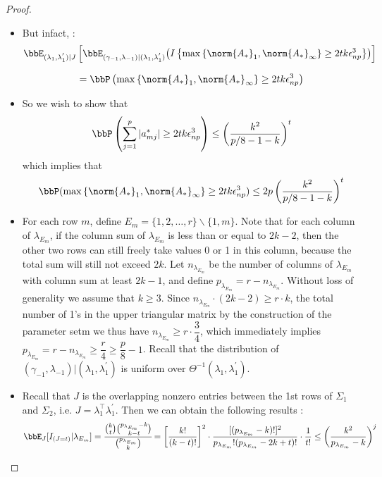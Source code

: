 \begin{proof}
\begin{itemize}
\begin{itemize}
    
\newpage
    \vspace{5mm}    
    \item But infact, :
    $$
    \bbE_{{(\lambda_{1},\lambda_1^{'})}\vert J}\left[\bbE_{(\gamma_{-1},\lambda_{-1}) \vert (\lambda_1,\lambda_1^{'})} {\left( I \left\{ \max\left\{\norm{A_*}_1,\norm{A_*}_{\infty}\right\} \geq 2tk\epsilon^3_{np} \right\}  \right)}\right]
    $$
    
    $$
    = \bbP\left( \max\left\{\norm{A_*}_1,\norm{A_*}_{\infty}\right\} \geq 2tk\epsilon^3_{np} \right)
    $$

    \vspace{5mm}    
    \item So we wish to show that
    $$
    \bbP\left(\displaystyle\sum_{j=1}^{p}{|a^*_{mj}|} \geq 2tk\epsilon^3_{np} \right) \leq \left(\dfrac{k^2}{p/8 -1 -k}  \right)^t
    $$
    which implies that
    $$
    \bbP( \max\left\{\norm{A_*}_1,\norm{A_*}_{\infty}\right\} \geq 2tk\epsilon^3_{np}) \leq 2p\left(\dfrac{k^2}{p/8 -1 -k}  \right)^t
    $$
    \vspace{5mm}    
    \item For each row $m$, define $E_m = \{1,2,\ldots,r\} \backslash \{1,m\}.$ Note that for each column of $\lambda_{E_m}$, if the column sum of $\lambda_{E_m}$ is less than or equal to $2k-2$, then the other two rows can still freely take values 0 or 1 in this column, because the total sum will still not exceed $2k$. Let $n_{\lambda_{E_m}}$ be the number of columns of $\lambda_{E_m}$ with column sum at least $2k-1$, and define $p_\lambda_{E_m} = r - n_{\lambda_{E_m}}$. Without loss of generality we assume that $k\geq 3$. Since $n_{\lambda_{E_m}}\cdot(2k-2)\geq r\cdot k$, the total number of 1's in the upper triangular matrix by the construction of the parameter setm we thus have $n_{\lambda_{E_m}} \geq r \cdot \dfrac{3}{4}$, which immediately implies $p_{\lambda_{E_m}} = r -  n_{\lambda_{E_m}} \geq \dfrac{r}{4} \geq \dfrac{p}{8} - 1$. Recall that the distribution of $(\gamma_{-1},\lambda_{-1})|(\lambda_1,{\lambda^{'}_{1}})$ is uniform over $\Theta^{-1}(\lambda_1,{\lambda^{'}_{1}})$.

    \vspace{5mm}    
    \item Recall that $J$ is the overlapping nonzero entries between the 1st rows of $\Sigma_1$ and $\Sigma_2$, i.e. $J=\lambda^{\top}_{1} \lambda^{'}_{1}$. Then we can obtain the following results : 
    $$
    \bbE_J [ I_{(J=t)} | \lambda_{E_m} ] = \cfrac{{k \choose t}{{p_{\lambda_{E_m}} -k} \choose {k-t}}}{{{p_{\lambda_{E_m}} } \choose {k}}}
    = \left[ \dfrac{k!}{(k-t)!} \right]^2 \cdot \dfrac{[(p_{\lambda_{E_m}} -k)!]^2}{p_{\lambda_{E_m}}! (p_{\lambda_{E_m}} -2k +t)!}\cdot \dfrac{1}{t!}\leq \left(\dfrac{k^2}{p_{\lambda_{E_m}}-k}\right)^j
    $$
    

\end{itemize}
\end{itemize}
\end{proof}
